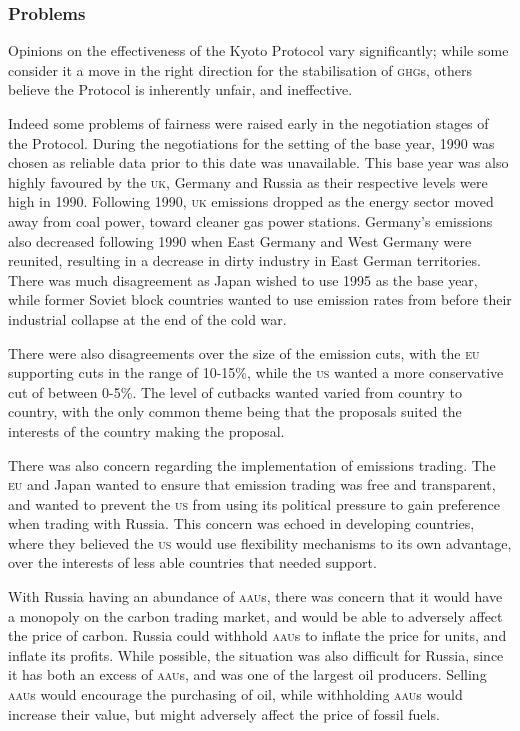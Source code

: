 \subsubsection{Problems}

Opinions on the effectiveness of the Kyoto Protocol vary significantly; while some consider it a move in the right direction for the stabilisation of \textsc{ghg}s, others believe the Protocol is inherently unfair, and ineffective.

Indeed some problems of fairness were raised early in the negotiation stages of the Protocol. During the negotiations for the setting of the base year, 1990 was chosen as reliable data prior to this date was unavailable. This base year was also highly favoured by the \textsc{uk}, Germany and Russia as their respective \CO levels were high in 1990. Following 1990, \textsc{uk} emissions dropped as the energy sector moved away from coal power, toward cleaner gas power stations. Germany's \CO emissions also decreased following 1990 when East Germany and West Germany were reunited, resulting in a decrease in dirty industry in East German territories. There was much disagreement as Japan wished to use 1995 as the base year, while former Soviet block countries wanted to use emission rates from before their industrial collapse at the end of the cold war.

There were also disagreements over the size of the emission cuts, with the \textsc{eu} supporting cuts in the range of 10-15\%, while the \textsc{us} wanted a more conservative cut of between 0-5\%. The level of cutbacks wanted varied from country to country, with the only common theme being that the proposals suited the interests of the country making the proposal.~\cite{Grubb-economics}

There was also concern regarding the implementation of emissions trading. The \textsc{eu} and Japan wanted to ensure that emission trading was free and transparent, and wanted to prevent the \textsc{us} from using its political pressure to gain preference when trading with Russia. This concern was echoed in developing countries, where they believed the \textsc{us} would use flexibility mechanisms to its own advantage, over the interests of less able countries that needed support.

With Russia having an abundance of \textsc{aau}s, there was concern that it would have a monopoly on the carbon trading market, and would be able to adversely affect the price of carbon. Russia could withhold \textsc{aau}s to inflate the price for units, and inflate its profits. While possible, the situation was also difficult for Russia, since it has both an excess of \textsc{aau}s, and was one of the largest oil producers. Selling \textsc{aau}s would encourage the purchasing of oil, while withholding \textsc{aau}s would increase their value, but might adversely affect the price of fossil fuels.

